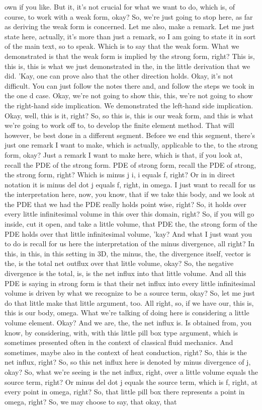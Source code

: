 \documentclass[10pt]{article}
\begin{document}
own if you like. But it, it's not crucial for what we want to do, which is, of course, to work with a weak form, okay? So, we're just going to stop here, as far as deriving the weak form is concerned. Let me also, make a remark. Let me just state here, actually, it's more than just a remark, so I am going to state it in sort of the main text, so to speak. Which is to say that the weak form. What we demonstrated is that the weak form is implied by the strong form, right? This is, this is, this is what we just demonstrated in the, in the little derivation that we did. 'Kay, one can prove also that the other direction holds. Okay, it's not difficult. You can just follow the notes there and, and follow the steps we took in the one d case. Okay, we're not going to show this, this, we're not going to show the right-hand side implication. We demonstrated the left-hand side implication. Okay, well, this is it, right? So, so this is, this is our weak form, and this is what we're going to work off to, to develop the finite element method. That will however, be best done in a different segment. Before we end this segment, there's just one remark I want to make, which is actually, applicable to the, to the strong form, okay? Just a remark I want to make here, which is that, if you look at, recall the PDE of the strong form. PDE of strong form, recall the PDE of strong, the strong form, right? Which is minus j i, i equals f, right? Or in in direct notation it is minus del dot j equals f, right, in omega. I just want to recall for us the interpretation here, now,  you know, that if we take this body, and we look at the PDE that we had the PDE really holds point wise, right? So, it holds over every little infinitesimal volume in this over this domain, right? So, if you will go inside, cut it open, and take a little volume, that PDE the, the strong form of the PDE holds over that little infinitesimal volume, 'kay? And what I just want you to do is recall for us here the interpretation of the minus divergence, all right? In this, in this, in this setting in 3D, the minus, the, the divergence itself, vector is the, is the total net outflux over that little volume, okay? So, the negative divergence is the total, is, is the net influx into that little volume. And all this PDE is saying in strong form is that their net influx into every little infinitesimal volume is driven by what we recognize to be a source term, okay? So, let me just do that little make that little argument, too. All right, so, if we have our, this is, this is our body, omega. What we're talking of doing here is considering a little volume element. Okay? And we are, the, the net influx is. Is obtained from, you know, by considering, with, with this little pill box type argument, which is sometimes presented often in the context of classical fluid mechanics. And sometimes, maybe also in the context of heat conduction, right? So, this is the net influx, right? So, so this net influx here is denoted by minus divergence of j, okay? So, what we're seeing is the net influx, right, over a little volume equals the source term, right? Or minus del dot j equals the source term, which is f, right, at every point in omega, right? So, that little pill box there represents a point in omega, right? So, we may choose to say, that okay, that 
\end{document}
